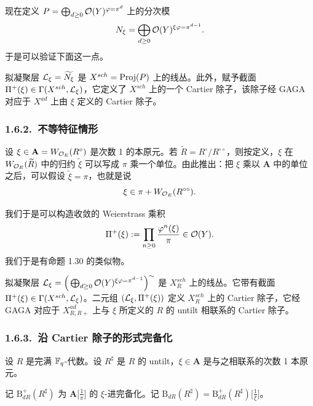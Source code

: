 现在定义 $P=\bigoplus_{d\ge0}\mathcal{O}(Y)^{\varphi=\pi^d}$ 上的分次模
\[
N_\xi=\bigoplus_{d\ge0}\mathcal{O}(Y)^{\xi\varphi=\pi^{d-1}}.
\]
于是可以验证下面这一点。

\begin{proposition}\label{prop:1.30}
拟凝聚层 $\mathcal{L}_\xi=\widetilde{N_\xi}$ 是 $X^{sch}=\operatorname{Proj}(P)$ 上的线丛。此外，赋予截面 $\Pi^+(\xi)\in\Gamma(X^{sch},\mathcal{L}_\xi)$，它定义了 $X^{sch}$ 上的一个 Cartier 除子，该除子经 GAGA 对应于 $X^{ad}$ 上由 $\xi$ 定义的 Cartier 除子。
\end{proposition}

\subsubsection*{1.6.2.\ 不等特征情形}

设 $\xi\in\mathbf{A}=W_{\mathcal{O}_E}(R^\circ)$ 是次数 1 的本原元。若 $\widetilde{R}=R^\circ/R^{\circ\circ}$，则按定义，$\xi$ 在 $W_{\mathcal{O}_E}(\widetilde{R})$ 中的归约 $\widetilde{\xi}$ 可以写成 $\pi$ 乘一个单位。由此推出：把 $\xi$ 乘以 $\mathbf{A}$ 中的单位之后，可以假设 $\widetilde{\xi}=\pi$，也就是说
\[
\xi\in\pi+W_{\mathcal{O}_E}(R^{\circ\circ}).
\]

我们于是可以构造收敛的 Weierstrass 乘积
\[
\Pi^+(\xi):=\prod_{n\ge0}\frac{\varphi^n(\xi)}{\pi}\in\mathcal{O}(Y).
\]
我们于是有命题 1.30 的类似物。

\begin{proposition}\label{prop:1.31}
拟凝聚层 $\mathcal{L}_\xi=\Big(\bigoplus_{d\ge0}\mathcal{O}(Y)^{\xi\varphi=\pi^{d-1}}\Big)^{\sim}$ 是 $X^{sch}_R$ 上的线丛。它带有截面 $\Pi^+(\xi)\in\Gamma(X^{sch},\mathcal{L}_\xi)$。二元组 $(\mathcal{L}_\xi,\Pi^+(\xi))$ 定义 $X^{sch}_R$ 上的 Cartier 除子，它经 GAGA 对应于 $X^{ad}_{R,R+}$ 上与 $\xi$ 所定义的 $R$ 的 untilt 相联系的 Cartier 除子。
\end{proposition}

\subsubsection*{1.6.3.\ 沿 Cartier 除子的形式完备化}

设 $R$ 是完满 $\mathbb{F}_q$-代数。设 $R^\sharp$ 是 $R$ 的 untilt，$\xi\in\mathbf{A}$ 是与之相联系的次数 1 本原元。

\begin{definition}\label{def:1.32}
记 $\mathrm{B}^{+}_{dR}(R^\sharp)$ 为 $\mathbf{A}\big[\frac{1}{\pi}\big]$ 的 $\xi$-进完备化。记 $\mathrm{B}_{dR}(R^\sharp)=\mathrm{B}^{+}_{dR}(R^\sharp)\big[\frac{1}{\xi}\big]$。
\end{definition}

